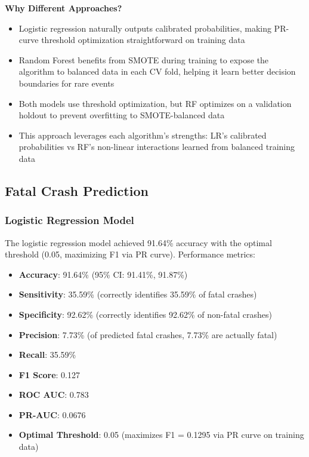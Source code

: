 \documentclass[12pt,a4paper]{article}
\begin{document}
\textbf{Why Different Approaches?}
\begin{itemize}
    \item Logistic regression naturally outputs calibrated probabilities, making PR-curve threshold optimization straightforward on training data
    \item Random Forest benefits from SMOTE during training to expose the algorithm to balanced data in each CV fold, helping it learn better decision boundaries for rare events
    \item Both models use threshold optimization, but RF optimizes on a validation holdout to prevent overfitting to SMOTE-balanced data
    \item This approach leverages each algorithm's strengths: LR's calibrated probabilities vs RF's non-linear interactions learned from balanced training data
\end{itemize}

\subsection{Fatal Crash Prediction}

\subsubsection{Logistic Regression Model}
The logistic regression model achieved 91.64\% accuracy with the optimal threshold (0.05, maximizing F1 via PR curve). Performance metrics:
\begin{itemize}
    \item \textbf{Accuracy}: 91.64\% (95\% CI: 91.41\%, 91.87\%)
    \item \textbf{Sensitivity}: 35.59\% (correctly identifies 35.59\% of fatal crashes)
    \item \textbf{Specificity}: 92.62\% (correctly identifies 92.62\% of non-fatal crashes)
    \item \textbf{Precision}: 7.73\% (of predicted fatal crashes, 7.73\% are actually fatal)
    \item \textbf{Recall}: 35.59\%
    \item \textbf{F1 Score}: 0.127
    \item \textbf{ROC AUC}: 0.783
    \item \textbf{PR-AUC}: 0.0676
    \item \textbf{Optimal Threshold}: 0.05 (maximizes F1 = 0.1295 via PR curve on training data)
\end{itemize}
\end{document}
